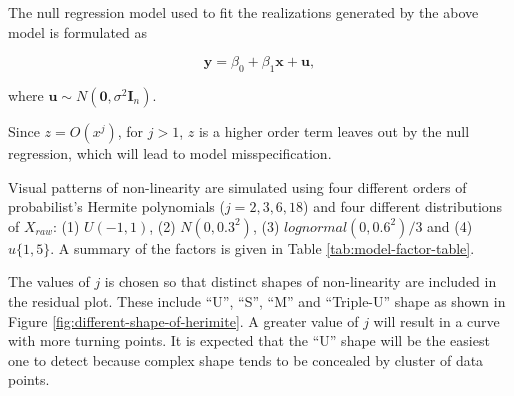 \documentclass[]{interact}
\theoremstyle{plain}%
\theoremstyle{definition}
\theoremstyle{remark}
\begin{document}
The null regression model used to fit the realizations generated by the
above model is formulated as

\begin{equation} \label{eq:null-model}
\boldsymbol{y} = \beta_0 + \beta_1 \boldsymbol{x} + \boldsymbol{u},
\end{equation}

\noindent where
\(\boldsymbol{u} \sim N(\boldsymbol{0}, \sigma^2\boldsymbol{I}_n)\).

Since \(z = O(x^j)\), for \(j > 1\), \(z\) is a higher order term leaves
out by the null regression, which will lead to model misspecification.

Visual patterns of non-linearity are simulated using four different
orders of probabilist's Hermite polynomials (\(j = 2, 3, 6, 18\)) and
four different distributions of \(X_{raw}\): (1) \(U(-1, 1)\), (2)
\(N(0, 0.3^2)\), (3) \(lognormal(0, 0.6^2)/3\) and (4) \(u\{1, 5\}\). A
summary of the factors is given in Table \ref{tab:model-factor-table}.

\begin{table}

\caption{\label{tab:model-factor-table}Description of all factors involved in the non-linear and heteroskedasticity studies.}
\centering
{}
\end{table}

The values of \(j\) is chosen so that distinct shapes of non-linearity
are included in the residual plot. These include ``U'', ``S'', ``M'' and
``Triple-U'' shape as shown in Figure
\ref{fig:different-shape-of-herimite}. A greater value of \(j\) will
result in a curve with more turning points. It is expected that the
``U'' shape will be the easiest one to detect because complex shape
tends to be concealed by cluster of data points.
\end{document}
